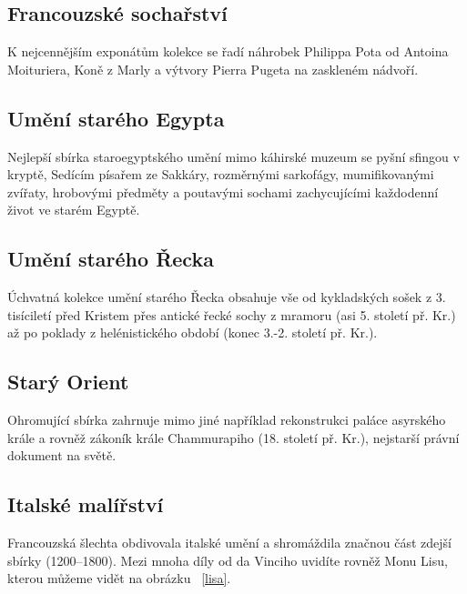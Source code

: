 \subsection{Francouzské sochařství}
K nejcennějším exponátům kolekce se řadí náhrobek Philippa Pota od Antoina Moituriera, Koně z Marly a výtvory Pierra Pugeta na zaskleném nádvoří.

\subsection{Umění starého Egypta}
Nejlepší sbírka staroegyptského umění mimo káhirské muzeum se pyšní sfingou v kryptě, Sedícím písařem ze Sakkáry, rozměrnými sarkofágy, mumifikovanými zvířaty, hrobovými předměty a poutavými sochami zachycujícími každodenní život ve starém Egyptě.

\subsection{Umění starého Řecka}
Úchvatná kolekce umění starého Řecka obsahuje vše od kykladských sošek z 3. tisíciletí před Kristem přes antické řecké sochy z mramoru (asi 5. století př. Kr.) až po poklady z helénistického období (konec 3.-2. století př. Kr.).

\subsection{Starý Orient}
Ohromující sbírka zahrnuje mimo jiné například rekonstrukci paláce asyrského krále a rovněž zákoník krále Chammurapiho (18. století př. Kr.), nejstarší právní dokument na světě.

\subsection{Italské malířství}
Francouzská šlechta obdivovala italské umění a shromáždila značnou část zdejší sbírky (1200–1800). Mezi mnoha díly od da Vinciho uvidíte rovněž Monu Lisu, kterou můžeme vidět na obrázku ~\ref{lisa}.

